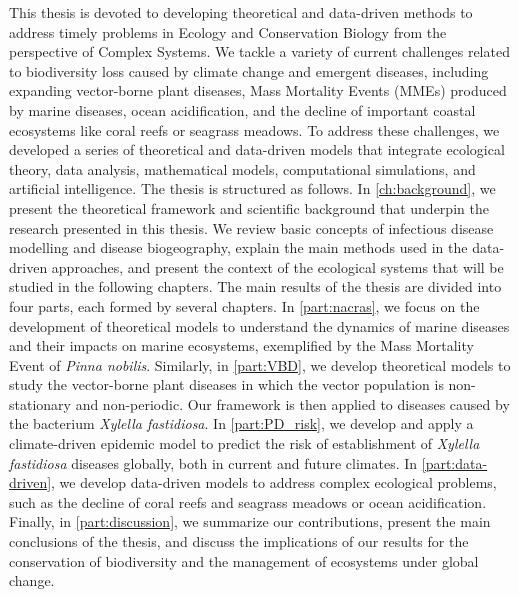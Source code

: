 This thesis is devoted to developing theoretical and data-driven methods to
address timely problems in Ecology and Conservation Biology from the
perspective of Complex Systems. We tackle a variety of current challenges
related to biodiversity loss caused by climate change and emergent diseases,
including expanding vector-borne plant diseases, Mass Mortality Events (MMEs)
produced by marine diseases, ocean acidification, and the decline of important
coastal ecosystems like coral reefs or seagrass meadows. To address these
challenges, we developed a series of theoretical and data-driven models that
integrate ecological theory, data analysis, mathematical models, computational
simulations, and artificial intelligence. The thesis is structured as follows.
In \cref{ch:background}, we present the theoretical framework and scientific
background that underpin the research presented in this thesis. We review
basic concepts of infectious disease modelling and disease biogeography,
explain the main methods used in the data-driven approaches, and present the
context of the ecological systems that will be studied in the following
chapters. The main results of the thesis are divided into four parts, each
formed by several chapters. In \cref{part:nacras}, we focus on the development
of theoretical models to understand the dynamics of marine diseases and their
impacts on marine ecosystems, exemplified by the Mass Mortality Event of
\textit{Pinna nobilis}. Similarly, in \cref{part:VBD}, we develop theoretical
models to study the vector-borne plant diseases in which the vector population
is non-stationary and non-periodic. Our framework is then applied to diseases
caused by the bacterium \textit{Xylella fastidiosa}. In \cref{part:PD_risk}, we
develop and apply a climate-driven epidemic model to predict the risk of
establishment of \textit{Xylella fastidiosa} diseases globally, both in current
and future climates. In \cref{part:data-driven}, we develop data-driven models
to address complex ecological problems, such as the decline of coral reefs and
seagrass meadows or ocean acidification. Finally, in \cref{part:discussion}, we
summarize our contributions, present the main conclusions of the thesis, and
discuss the implications of our results for the conservation of biodiversity
and the management of ecosystems under global change.